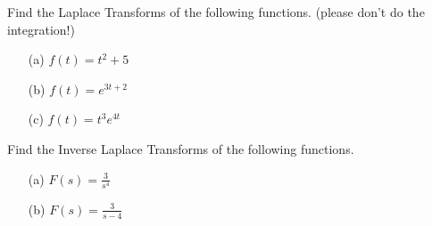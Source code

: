 \begin{problem}
    Find the Laplace Transforms of the following functions. (please don't do the integration!)
    \begin{enumerate}
        \item[(a)] $f(t) = t^2+5$
        \item[(b)] $f(t) = e^{3t+2}$
        \item[(c)] $f(t) = t^3 e^{4t}$
    \end{enumerate}
\end{problem}


\begin{problem}
    Find the Inverse Laplace Transforms of the following functions.
    \begin{enumerate}
        \item[(a)] $F(s) = \frac{3}{s^4}$
        \item[(b)] $F(s) = \frac{3}{s-4}$
    \end{enumerate}
\end{problem}


